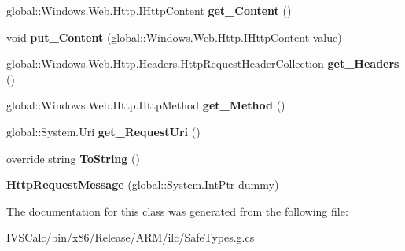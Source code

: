 \begin{DoxyCompactItemize}
global\+::\+Windows.\+Web.\+Http.\+I\+Http\+Content {\bfseries get\+\_\+\+Content} ()
\item 
\mbox{\label{class_windows_1_1_web_1_1_http_1_1_http_request_message_aef2c0a57c9fe364d410c4ea568aa1406}} 
void {\bfseries put\+\_\+\+Content} (global\+::\+Windows.\+Web.\+Http.\+I\+Http\+Content value)
\item 
\mbox{\label{class_windows_1_1_web_1_1_http_1_1_http_request_message_a7954249df0daf81ada6573d24a237db8}} 
global\+::\+Windows.\+Web.\+Http.\+Headers.\+Http\+Request\+Header\+Collection {\bfseries get\+\_\+\+Headers} ()
\item 
\mbox{\label{class_windows_1_1_web_1_1_http_1_1_http_request_message_a4e6485899f5654f598f0911225702f86}} 
global\+::\+Windows.\+Web.\+Http.\+Http\+Method {\bfseries get\+\_\+\+Method} ()
\item 
\mbox{\label{class_windows_1_1_web_1_1_http_1_1_http_request_message_a60eee69978be3f99e85a37b7bf05850d}} 
global\+::\+System.\+Uri {\bfseries get\+\_\+\+Request\+Uri} ()
\item 
\mbox{\label{class_windows_1_1_web_1_1_http_1_1_http_request_message_a311ec1966990d2a837636dfe734907f3}} 
override string {\bfseries To\+String} ()
\item 
\mbox{\label{class_windows_1_1_web_1_1_http_1_1_http_request_message_a266f73c079be0dd9c1b831b69dd1731e}} 
{\bfseries Http\+Request\+Message} (global\+::\+System.\+Int\+Ptr dummy)
\end{DoxyCompactItemize}


The documentation for this class was generated from the following file\+:\begin{DoxyCompactItemize}
\item 
I\+V\+S\+Calc/bin/x86/\+Release/\+A\+R\+M/ilc/Safe\+Types.\+g.\+cs\end{DoxyCompactItemize}
